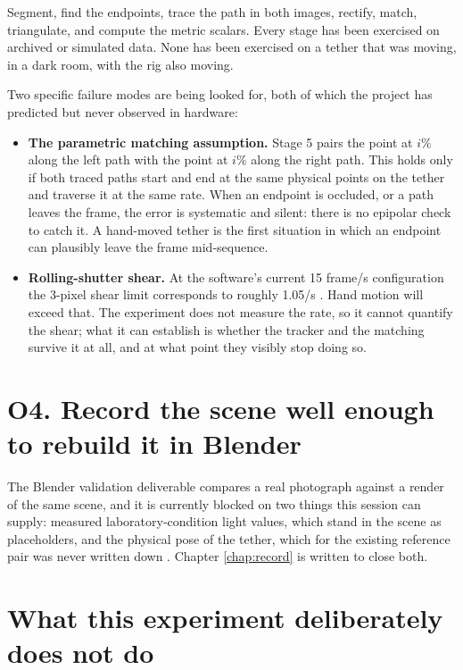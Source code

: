 Segment, find the endpoints, trace the path in both images, rectify, match,
triangulate, and compute the metric scalars. Every stage has been exercised on
archived or simulated data. None has been exercised on a tether that was
moving, in a dark room, with the rig also moving.

Two specific failure modes are being looked for, both of which the project has
predicted but never observed in hardware:

\begin{itemize}
    \item \textbf{The parametric matching assumption.} Stage 5 pairs the point
    at $i\%$ along the left path with the point at $i\%$ along the right path.
    This holds only if both traced paths start and end at the same physical
    points on the tether and traverse it at the same rate. When an endpoint is
    occluded, or a path leaves the frame, the error is systematic and silent:
    there is no epipolar check to catch it. A hand-moved tether is the first
    situation in which an endpoint can plausibly leave the frame mid-sequence.

    \item \textbf{Rolling-shutter shear.} At the software's current 15 frame/s
    configuration the 3-pixel shear limit corresponds to roughly
    1.05\textdegree/s \cite{linku_rollingshutter}. Hand motion will exceed
    that. The experiment does not measure the rate, so it cannot quantify the
    shear; what it can establish is whether the tracker and the matching
    survive it at all, and at what point they visibly stop doing so.
\end{itemize}

\section{O4. Record the scene well enough to rebuild it in Blender}

The Blender validation deliverable compares a real photograph against a render
of the same scene, and it is currently blocked on two things this session can
supply: measured laboratory-condition light values, which stand in the scene as
placeholders, and the physical pose of the tether, which for the existing
reference pair was never written down
\cite{linku_blender_validation}. Chapter \ref{chap:record} is written to close
both.

\section{What this experiment deliberately does not do}
\label{sec:why-by-hand}

